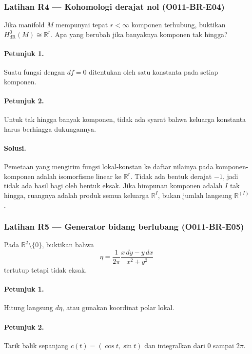 \subsubsection*{Latihan R4 — Kohomologi derajat nol (O011-BR-E04)}
\label{o011-br-e04}

Jika manifold $M$ mempunyai tepat $r<\infty$ komponen terhubung, buktikan
$H^0_{\mathrm{dR}}(M)\cong\mathbb R^r$. Apa yang berubah jika banyaknya
komponen tak hingga?

\paragraph{Petunjuk 1.}
Suatu fungsi dengan $df=0$ ditentukan oleh satu konstanta pada setiap
komponen.

\paragraph{Petunjuk 2.}
Untuk tak hingga banyak komponen, tidak ada syarat bahwa keluarga konstanta
harus berhingga dukungannya.

\paragraph{Solusi.}
Pemetaan yang mengirim fungsi lokal-konstan ke daftar nilainya pada
komponen-komponen adalah isomorfisme linear ke $\mathbb R^r$. Tidak ada bentuk
derajat $-1$, jadi tidak ada hasil bagi oleh bentuk eksak. Jika himpunan
komponen adalah $I$ tak hingga, ruangnya adalah produk semua keluarga
$\mathbb R^I$, bukan jumlah langsung $\mathbb R^{(I)}$.

\subsubsection*{Latihan R5 — Generator bidang berlubang (O011-BR-E05)}
\label{o011-br-e05}

Pada $\mathbb R^2\setminus\{0\}$, buktikan bahwa
\[
 \eta=\frac{1}{2\pi}\frac{x\,dy-y\,dx}{x^2+y^2}
\]
tertutup tetapi tidak eksak.

\paragraph{Petunjuk 1.}
Hitung langsung $d\eta$, atau gunakan koordinat polar lokal.

\paragraph{Petunjuk 2.}
Tarik balik sepanjang $c(t)=(\cos t,\sin t)$ dan integralkan dari $0$ sampai
$2\pi$.

